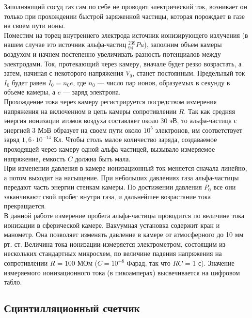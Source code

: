 Заполняющий сосуд газ сам по себе не проводит электрический ток, возникает он только
при прохождении быстрой заряженной частицы, которая порождает в газе на своем пути ионы. \\

Поместим на торец внутреннего электрода источник ионизирующего излучения (в нашем случае
это источник альфа-частиц $ ^{239}_{94} Pu $), заполним объем камеры воздухом и начнем
постепенно увеличивать разность потенциалов между электродами. Ток, протекающий через
камеру, вначале будет резко возрастать, а затем, начиная с некоторого напряжения $ V_0 $,
станет постоянным. Предельный ток $ I_0 $ будет равен $ I_0 = n_0e $, где $ n_0 $ ---
число пар ионов, образуемых в секунду в объеме камеры, а $ e $ --- заряд электрона. \\

Прохождение тока через камеру регистрируется посредством измерения напряжения на включенном
в цепь камеры сопротивлении $ R $. Так как средняя энергия ионизации атомов воздуха
составляет около 30 эВ, то альфа-частица с энергией 3 МэВ образует на своем пути около
$ 10^5 $ электронов, им соответствует заряд $1,6 \cdot 10^{-14} $ Кл. Чтобы столь малое
количество заряда, создаваемое проходящей через камеру одной альфа-частицей, вызывало
измеряемое напряжение, емкость $ C $ должна быть мала. \\

При изменении давления в камере ионизационный ток меняется сначала линейно, а потом выходит
на насыщение. При небольших давлениях газа альфа-частицы передают часть энергии стенкам
камеры. По достижении давления $ P_0 $ все они заканчивают свой пробег внутри газа, и
дальнейшее возрастание тока прекращается. \\

В данной работе измерение пробега альфа-частицы проводится по величине тока ионизации в
сферической камере. Вакуумная установка содержит кран и манометр. Она позволяет изменять
давление в камере от атмосферного до 10 мм рт. ст. Величина тока ионизации измеряется
электрометром, состоящим из нескольких стандартных микросхем, по величине падения
напряжения на сопротивлении $ R $ = 100 МОм ($ C = 10^{-8} $ Фарад, так что $ RC $ = 1 с).
Значение измеряемого ионизационного тока (в пикоамперах) высвечивается на цифровом табло. \\

\subsection{Сцинтилляционный счетчик}

